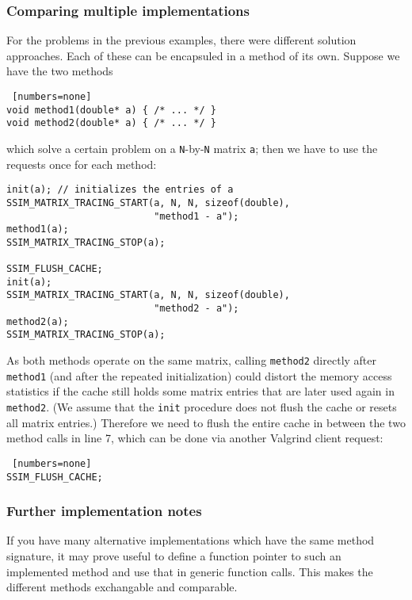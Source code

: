 \subsubsection*{Comparing multiple implementations}
For the problems in the previous examples, there were different solution approaches. Each of these can be encapsuled in a method of its own. Suppose we have the two methods
\begin{lstlisting} [numbers=none]
void method1(double* a) { /* ... */ }
void method2(double* a) { /* ... */ }
\end{lstlisting}
which solve a certain problem on a \texttt{N}-by-\texttt{N} matrix \texttt{a}; then we have to use the requests once for each method:
\begin{lstlisting}
init(a); // initializes the entries of a
SSIM_MATRIX_TRACING_START(a, N, N, sizeof(double), 
                          "method1 - a");
method1(a);
SSIM_MATRIX_TRACING_STOP(a);

SSIM_FLUSH_CACHE;
init(a);
SSIM_MATRIX_TRACING_START(a, N, N, sizeof(double), 
                          "method2 - a");
method2(a);
SSIM_MATRIX_TRACING_STOP(a);
\end{lstlisting}
As both methods operate on the same matrix, calling \texttt{method2} directly after \texttt{method1} (and after the repeated initialization) could distort the memory access statistics if the cache still holds some matrix entries that are later used again in \texttt{method2}. (We assume that the \texttt{init} procedure does not flush the cache or resets all matrix entries.) Therefore we need to flush the entire cache in between the two method calls in line 7, which can be done via another Valgrind client request:
\begin{lstlisting} [numbers=none]
SSIM_FLUSH_CACHE;
\end{lstlisting}

\subsubsection*{Further implementation notes}
If you have many alternative implementations which have the same method signature, it may prove useful to define a function pointer to such an implemented method and use that in generic function calls. This makes the different methods exchangable and comparable.
